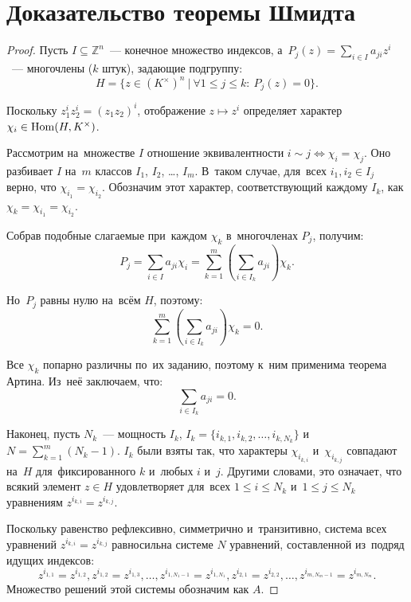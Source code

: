 \documentclass{article}
\begin{document}
\section{Доказательство теоремы Шмидта}

\begin{proof}
    Пусть $I \subseteq \mathbb{Z}^n$~— конечное множество индексов,
    а~$P_j(z) = \sum_{i \in I} a_{ji} z^i$~— многочлены ($k$ штук), задающие подгруппу:
    $$
        H = \{ z \in (K^{\times})^n\ |\ \forall 1 \leq j \leq k{:}\ P_j(z) = 0 \}.
    $$

    Поскольку $z_1^{i} z_2^{i} = (z_1 z_2)^i$, отображение $z \mapsto z^i$ определяет
    характер $\chi_i \in \mathrm{Hom}(H, K^{\times})$.

    Рассмотрим на~множестве $I$ отношение эквивалентности $i \sim j \Leftrightarrow \chi_i = \chi_j$.
    Оно разбивает $I$ на~$m$ классов $I_1$, $I_2$, …, $I_m$. В~таком случае, для~всех $i_1, i_2 \in I_j$ верно, что $\chi_{i_1} = \chi_{i_2}$.
    Обозначим этот характер, соответствующий каждому $I_k$, как $\chi_k = \chi_{i_1} = \chi_{i_2}$.

    Собрав подобные слагаемые при~каждом $\chi_k$ в~многочленах $P_j$, получим:
    $$
        P_j = \sum_{i \in I} a_{ji} \chi_i = \sum_{k = 1}^{m} \left( \sum_{i \in I_k} a_{ji} \right) \chi_k.
    $$

    Но~$P_j$ равны нулю на~всём $H$, поэтому:
    $$
    \sum_{k = 1}^{m} \left( \sum_{i \in I_k} a_{ji} \right) \chi_k = 0.
    $$

    Все $\chi_k$ попарно различны по~их заданию, поэтому к~ним применима теорема Артина. Из~неё заключаем, что:
    $$
    \sum_{i \in I_k} a_{ji} = 0.
    $$

    Наконец, пусть $N_k$~— мощность $I_k$, $I_k = \{i_{k, 1}, i_{k, 2}, \ldots, i_{k, N_k}\}$ и~$N = \sum_{k = 1}^m (N_k - 1)$.
    $I_k$ были взяты так, что характеры $\chi_{i_{k, i}}$ и~$\chi_{i_{k, j}}$ совпадают на~$H$ для~фиксированного $k$ и~любых $i$ и~$j$.
    Другими словами, это означает, что всякий элемент $z \in H$ удовлетворяет для~всех $1 \leq i \leq N_k$ и~$1 \leq j \leq N_k$
    уравнениям $z^{i_{k, i}} = z^{i_{k, j}}$.

    Поскольку равенство рефлексивно, симметрично и~транзитивно, система всех уравнений $z^{i_{k, i}} = z^{i_{k, j}}$ равносильна
    системе $N$ уравнений, составленной из~подряд идущих индексов:
    $$
        z^{i_{1, 1}} = z^{i_{1, 2}}, z^{i_{1, 2}} = z^{i_{1, 3}}, \ldots, z^{i_{1, N_1 - 1}} = z^{i_{1, N_1}}, z^{i_{2, 1}} = z^{i_{2, 2}}, \ldots, z^{i_{m, N_m - 1}} = z^{i_{m, N_m}}.
    $$
    Множество решений этой системы обозначим как $A$.


\end{proof}
\end{document}
